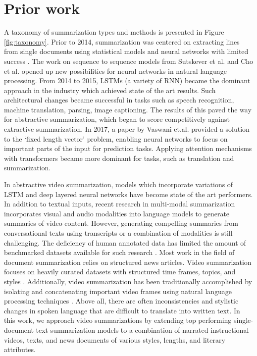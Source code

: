 \documentclass[sigconf]{acmart}
\begin{document}
\section{Prior work}
A taxonomy of summarization types and methods is presented in Figure \ref{fig:taxonomy}.  Prior to 2014, summarization was centered on extracting lines from single documents using statistical models and neural networks with limited success \cite{DBLP:conf/emnlp/SvoreVB07} \cite{inproceedings}. The work on sequence to sequence models from Sutskever et al. \cite{DBLP:journals/corr/SutskeverVL14} and Cho et al. \cite{DBLP:journals/corr/ChoMGBSB14} opened up new possibilities for neural networks in natural language processing. From 2014 to 2015, LSTMs (a variety of RNN) became the dominant approach in the industry which achieved state of the art results. Such architectural changes became successful in tasks such as speech recognition, machine translation, parsing, image captioning. The results of this paved the way for abstractive summarization, which began to score competitively against extractive summarization. In 2017, a paper by Vaswani et.al.  \cite{DBLP:journals/corr/VaswaniSPUJGKP17} provided a solution to the ‘fixed length vector’ problem, enabling neural networks to focus on important parts of the input for prediction tasks. Applying attention mechanisms with transformers became more dominant for tasks, such as translation and summarization.

In abstractive video summarization, models which incorporate variations of LSTM and deep layered neural networks have become state of the art performers. In addition to textual inputs, recent research in multi-modal summarization incorporates visual and audio modalities into language models to generate summaries of video content. However, generating compelling summaries from conversational texts using transcripts or a combination of modalities is still challenging. The deficiency of human annotated data has limited the amount of benchmarked datasets available for such research \cite{palaskar-etal-2019-multimodal} \cite{li-etal-2017-multi}. Most work in the field of document summarization relies on structured news articles. Video summarization focuses on heavily curated datasets with structured time frames, topics, and styles \cite{1221239}. Additionally, video summarization has been traditionally accomplished by isolating and concatenating important video frames using natural language processing techniques \cite{DBLP:conf/icmcs/ErolLH03}. Above all, there are often inconsistencies and stylistic changes in spoken language that are difficult to translate into written text. In this work, we approach video summarizations by extending top performing single-document text summarization models \cite{rush-etal-2015-neural} to a combination of narrated instructional videos, texts, and news documents of various styles, lengths, and literary attributes.
\end{document}
